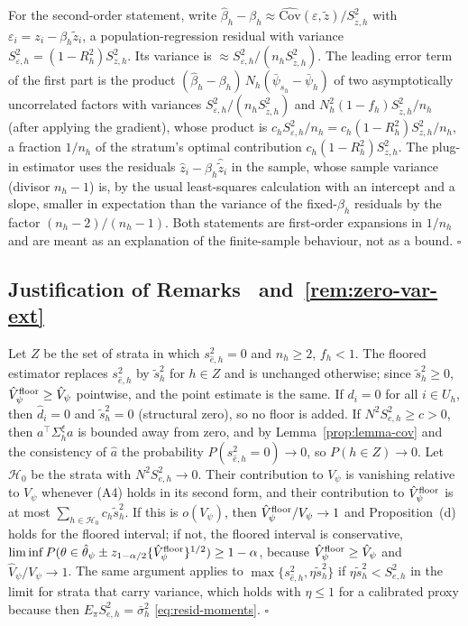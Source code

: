 For the second-order statement, write $\hat\beta_h-\beta_h\approx\widehat{\mathrm{Cov}}(\varepsilon,\tilde z)/S^2_{\tilde z,h}$ with $\varepsilon_i=z_i-\beta_h\tilde z_i$, a population-regression residual with variance $S^2_{\varepsilon,h}=(1-R_h^2)S^2_{z,h}$.
Its variance is $\approx S^2_{\varepsilon,h}/(n_hS^2_{\tilde z,h})$. The leading error term of the first part is the product $(\hat\beta_h-\beta_h)\,N_h(\bar\psi_{s_h}-\bar\psi_h)$ of two asymptotically uncorrelated factors with variances
$S^2_{\varepsilon,h}/(n_hS^2_{\tilde z,h})$ and $N_h^2(1-f_h)S^2_{\tilde z,h}/n_h$ (after applying the gradient), whose product is $c_hS^2_{\varepsilon,h}/n_h=c_h(1-R_h^2)S^2_{z,h}/n_h$, a fraction $1/n_h$ of the stratum's optimal
contribution $c_h(1-R_h^2)S^2_{z,h}$. The plug-in estimator uses the residuals $\hat z_i-\hat\beta_h\hat{\tilde z}_i$ in the sample, whose sample variance (divisor $n_h-1$) is, by the usual least-squares calculation with an
intercept and a slope, smaller in expectation than the variance of the fixed-$\beta_h$ residuals by the factor $(n_h-2)/(n_h-1)$. Both statements are first-order expansions in $1/n_h$ and are meant as an explanation of the finite-sample behaviour, not as a bound. $\square$

\subsection{Justification of Remarks~ and~\ref{rem:zero-var-ext}}

Let $Z$ be the set of strata in which $s^2_{\hat e,h}=0$ and $n_h\ge2$, $f_h<1$. The floored estimator replaces $s^2_{\hat e,h}$ by $\tilde s^2_h$ for $h\in Z$ and is unchanged otherwise; since $\tilde s^2_h\ge0$, $\hat V^{\rm floor}_\psi\ge\hat V_\psi$ pointwise, and the point estimate is the same.
If $d_i=0$ for all $i\in U_h$, then $\hat d_i=0$ and $\tilde s^2_h=0$ (structural zero), so no floor is added. If $N^2S^2_{e,h}\ge c>0$, then $a^\top\Sigma^\xi_ha$ is bounded away from zero, and by Lemma~\ref{prop:lemma-cov} and the consistency of $\hat a$ the
probability $P(s^2_{\hat e,h}=0)\to0$, so $P(h\in Z)\to0$. Let $\mathcal H_0$ be the strata with $N^2S^2_{e,h}\to0$. Their contribution to $V_\psi$ is vanishing relative to $V_\psi$ whenever (A4) holds in its second form, and their contribution to
$\hat V^{\rm floor}_\psi$ is at most $\sum_{h\in\mathcal H_0}c_h\tilde s^2_h$. If this is $o(V_\psi)$, then $\hat V^{\rm floor}_\psi/V_\psi\to1$ and Proposition~(d) holds for the floored interval; if not, the floored interval is
conservative, $\liminf P(\theta\in\hat\theta_\psi\pm z_{1-\alpha/2}\{\hat V^{\rm floor}_\psi\}^{1/2})\ge1-\alpha$, because $\hat V^{\rm floor}_\psi\ge\hat V_\psi$ and $\hat V_\psi/V_\psi\to1$. The same argument applies to $\max\{s^2_{\hat e,h},\eta\tilde s^2_h\}$ if $\eta\tilde s^2_h<S^2_{e,h}$
in the limit for strata that carry variance, which holds with $\eta\le1$ for a calibrated proxy because then $E_\pi S^2_{e,h}=\bar\sigma^2_h$ \eqref{eq:resid-moments}. $\square$

